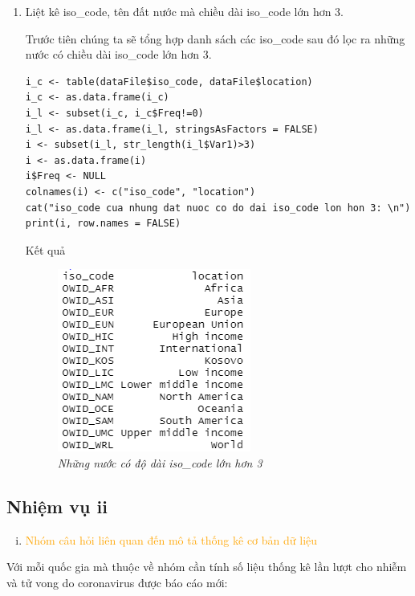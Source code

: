\documentclass[a4paper]{article}
\theoremstyle{definition}
\begin{document}
\begin{enumerate}[1)]
\item Liệt kê iso\_code, tên đất nước mà chiều dài iso\_code lớn hơn 3. 

Trước tiên chúng ta sẽ tổng hợp danh sách các iso\_code sau đó lọc ra những nước có chiều dài iso\_code lớn hơn 3.
\begin{lstlisting}
i_c <- table(dataFile$iso_code, dataFile$location)
i_c <- as.data.frame(i_c)
i_l <- subset(i_c, i_c$Freq!=0)
i_l <- as.data.frame(i_l, stringsAsFactors = FALSE)
i <- subset(i_l, str_length(i_l$Var1)>3)
i <- as.data.frame(i)
i$Freq <- NULL
colnames(i) <- c("iso_code", "location")
cat("iso_code cua nhung dat nuoc co do dai iso_code lon hon 3: \n")
print(i, row.names = FALSE)
\end{lstlisting}
Kết quả
    \begin{figure}[H]
        \begin{center}
            \includegraphics[scale=0.7]{i/i17.png}
        \end{center}
        \vspace{+3mm}\caption{\it Những nước có độ dài iso\_code lớn hơn 3}
    \end{figure}
\end{enumerate}





\subsection{Nhiệm vụ ii}
\begin{enumerate}[ii)]
\item \textcolor{orange}{Nhóm câu hỏi liên quan đến mô tả thống kê cơ bản dữ liệu}
\end{enumerate}

Với mỗi quốc gia mà thuộc về nhóm cần tính số liệu thống kê lần lượt cho nhiễm và tử vong do coronavirus được báo cáo mới:
\end{document}
